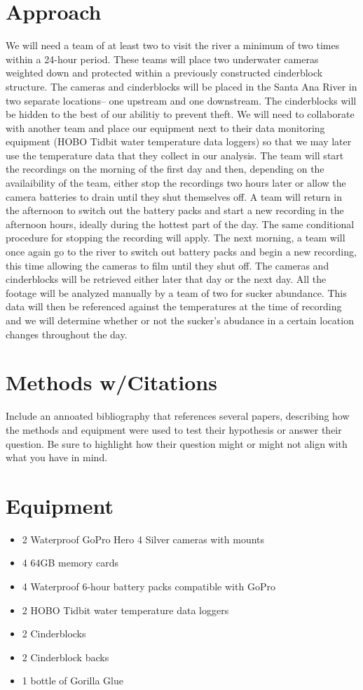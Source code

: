 \documentclass{tufte-handout}
\begin{document}
\section{Approach}
We will need a team of at least two to visit the river a minimum of two times within a 24-hour period. These teams will place two underwater cameras weighted down and protected within a previously constructed cinderblock structure. The cameras and cinderblocks will be placed in the Santa Ana River in two separate locations-- one upstream and one downstream. The cinderblocks will be hidden to the best of our abilitiy to prevent theft. We will need to collaborate with another team and place our equipment next to their data monitoring equipment (HOBO Tidbit water temperature data loggers) so that we may later use the temperature data that they collect in our analysis. 
The team will start the recordings on the morning of the first day and then, depending on the availaibility of the team, either stop the recordings two hours later or allow the camera batteries to drain until they shut themselves off. A team will return in the afternoon to switch out the battery packs and start a new recording in the afternoon hours, ideally during the hottest part of the day. The same conditional procedure for stopping the recording will apply. The next morning, a team will once again go to the river to switch out battery packs and begin a new recording, this time allowing the cameras to film until they shut off. The cameras and cinderblocks will be retrieved either later that day or the next day. All the footage will be analyzed manually by a team of two for sucker abundance. This data will then be referenced against the temperatures at the time of recording and we will determine whether or not the sucker's abudance in a certain location changes throughout the day.
 

\section{Methods w/Citations}
 Include an annoated bibliography that references several papers, describing how the methods and equipment were used to test their hypothesis or answer their question. Be sure to highlight how their question might or might not align with what you have in mind.
\section{Equipment}
\begin{itemize}
\item 2 Waterproof GoPro Hero 4 Silver cameras with mounts
\item 4 64GB memory cards
\item 4 Waterproof 6-hour battery packs compatible with GoPro
\item 2 HOBO Tidbit water temperature data loggers
\item 2 Cinderblocks
\item 2 Cinderblock backs
\item 1 bottle of Gorilla Glue
\end{itemize}
\end{document}
